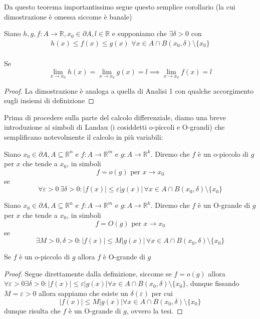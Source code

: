 \documentclass[openany]{book}
\begin{document}
\noindent Da questo teorema importantissimo segue questo semplice corollario (la cui dimostrazione è omessa siccome è banale)
\begin{theorem}
Siano $h, g, f: A \to \mathbb{R}, x_0 \in \partial A, l \in \mathbb{R}$ e supponiamo che $\exists \delta > 0$ con
\begin{align*}
h(x) \leq f(x) \leq g(x) \, \, \forall x \in A \cap B(x_0, \delta) \setminus \{ x_0 \}
\end{align*} \\
Se 
$$\lim\limits_{x \to x_0} h(x) = \lim\limits_{x \to x_0} g(x) = l \implies \lim_{x \to x_0} f(x) = l$$
\end{theorem}
\begin{proof}
La dimostrazione è analoga a quella di Analisi 1 con qualche accorgimento sugli insiemi di definizione
\end{proof}
\noindent Prima di procedere sulla parte del calcolo differenziale, diamo una breve introduzione ai simboli di Landau (i cosiddetti o-piccoli e O-grandi) che semplificano notevolmente il calcolo in più variabili:
\begin{definition}[o-piccolo]
Siano $x_0 \in \partial A, A \subseteq \mathbb{R}^n$ e $f: A \to \mathbb{R}^m$ e $g: A \to \mathbb{R}^k$. Diremo che $f$ è un o-piccolo di $g$ per $x$ che tende a $x_0$, in simboli
$$
f = o(g) \text{ per } x \to x_0
$$
se $$\forall \varepsilon > 0 \, \exists \delta > 0 : |f(x)| \leq \varepsilon |g(x)| \, \forall x \in A \cap B(x_0, \delta) \setminus \{ x_0 \}$$
\end{definition}
\begin{definition}[O-grande]
Siano $x_0 \in \partial A, A \subseteq \mathbb{R}^n$ e $f: A \to \mathbb{R}^m$ e $g: A \to \mathbb{R}^k$. Diremo che $f$ è un O-grande di $g$ per $x$ che tende a $x_0$, in simboli
$$
f = O(g) \text{ per } x \to x_0
$$
se $$\exists M > 0, \delta > 0 : |f(x)| \leq M|g(x)| \, \forall x \in A \cap B(x_0, \delta) \setminus \{ x_0 \} $$
\end{definition}
\begin{exercise}
Se $f$ è un o-piccolo di $g$ allora $f$ è O-grande di $g$
\end{exercise}
\begin{proof}
Segue direttamente dalla definizione, siccome se $f = o(g)$ allora $\forall \varepsilon > 0 \exists \delta > 0: |f(x)| \leq \varepsilon |g(x)| \forall x \in A \cap B(x_0, \delta) \setminus \{ x_0 \}$, dunque fissando $M = \varepsilon > 0$ allora sappiamo che esiste un $\delta(\varepsilon)$ per cui
$$
|f(x)| \leq M |g(x)| \forall x \in A \cap B(x_0, \delta) \setminus \{ x_0 \}
$$ 
dunque risulta che $f$ è un O-grande di $g$, ovvero la tesi.
\end{proof}
\end{document}
